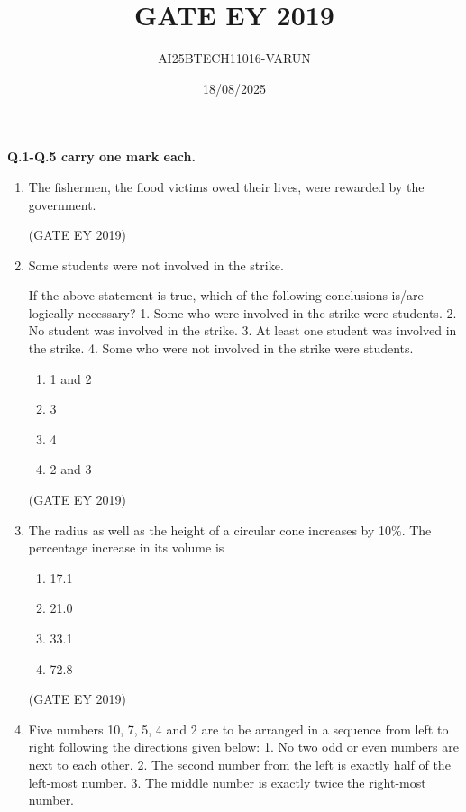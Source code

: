 \documentclass[journal,12pt,onecolumn]{IEEEtran}
\theoremstyle{remark}
\begin{document}
\title {GATE EY 2019}
\author{AI25BTECH11016-VARUN}
\date{18/08/2025}
\maketitle



\textbf{Q.1-Q.5 carry one mark each.}
  \begin{enumerate}
    \item The fishermen, \underline{\hspace{1.5cm}} the flood victims owed their lives, were rewarded by the government.
    
    \begin{enumerate}
\end{enumerate}
\hfill{(GATE EY 2019)}
    \item Some students were not involved in the strike.  

    If the above statement is true, which of the following conclusions is/are logically necessary?  
    1. Some who were involved in the strike were students.  
    2. No student was involved in the strike.  
    3. At least one student was involved in the strike.  
    4. Some who were not involved in the strike were students.  

    \begin{multicols}{4}
    \begin{enumerate}
        \item 1 and 2
        \item 3
        \item 4
        \item 2 and 3
    \end{enumerate}
    \end{multicols}
    \hfill{(GATE EY 2019)}
    \item The radius as well as the height of a circular cone increases by 10\%. The percentage increase in its volume is  
    \begin{multicols}{4}
    \begin{enumerate}
        \item 17.1
        \item 21.0
        \item 33.1
        \item 72.8
    \end{enumerate}
    \end{multicols}
    \hfill{(GATE EY 2019)}
    \item Five numbers 10, 7, 5, 4 and 2 are to be arranged in a sequence from left to right following the directions given below:  
    1. No two odd or even numbers are next to each other.  
    2. The second number from the left is exactly half of the left-most number.  
    3. The middle number is exactly twice the right-most number.  


\end{enumerate}
\end{document}

